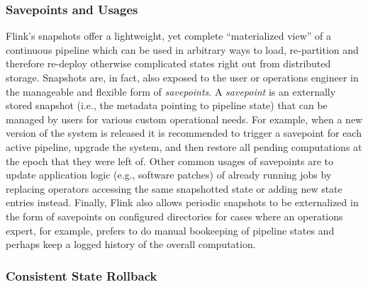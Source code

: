 \subsubsection{Savepoints and Usages}
Flink's snapshots offer a lightweight, yet complete ``materialized view'' of a continuous pipeline which can be used in arbitrary ways to load, re-partition and therefore re-deploy otherwise complicated states right out from distributed storage. Snapshots are, in fact, also exposed to the user or operations engineer in the manageable and flexible form of \emph{savepoints}. A \emph{savepoint} is an externally stored snapshot (i.e., the metadata pointing to pipeline state) that can be managed by users for various custom operational needs. For example, when a new version of the system is released it is recommended to trigger a savepoint for each active pipeline, upgrade the system, and then restore all pending computations at the epoch that they were left of. Other common usages of savepoints are to update application logic (e.g., software patches) of already running jobs by replacing operators accessing the same snapshotted state or adding new state entries instead. Finally, Flink also allows periodic snapshots to be externalized in the form of savepoints on configured directories for cases where an operations expert, for example, prefers to do manual bookeeping of pipeline states and perhaps keep a logged history of the overall computation. 

\subsubsection{Consistent State Rollback}




